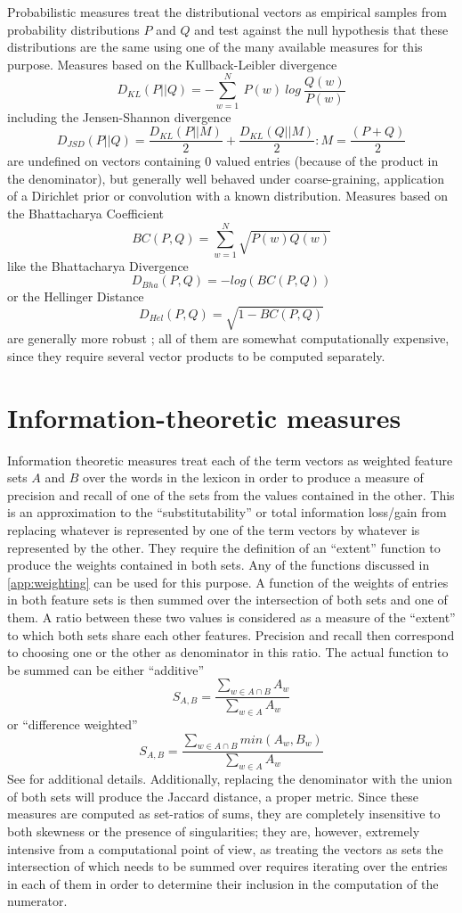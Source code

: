 Probabilistic measures treat the distributional vectors as empirical samples from probability distributions $P$ and $Q$ and test against the null hypothesis that these distributions are the same using one of the many available measures for this purpose.
Measures based on the Kullback-Leibler divergence
    $$D_{KL}(P||Q) = - \sum_{w=1}^N\:P(w)\:log\:\frac{Q(w)}{P(w)}$$
including the Jensen-Shannon divergence
    $$D_{JSD}(P||Q) = \frac{D_{KL}(P||M)}{2} + \frac{D_{KL}(Q||M)}{2} : M = \frac{( P + Q )}{2}$$
are undefined on vectors containing $0$ valued entries (because of the product in the denominator), but generally well behaved under coarse-graining, application of a Dirichlet prior or convolution with a known distribution.
Measures based on the Bhattacharya Coefficient
    $$BC(P,Q) = \sum_{w=1}^N \sqrt{ P(w) Q(w) }$$
like the Bhattacharya Divergence
    $$D_{Bha}(P,Q) = - log( BC(P,Q) )$$
or the Hellinger Distance
    $$D_{Hel}(P,Q) = \sqrt{ 1 - BC(P,Q) }$$
are generally more robust \citep{dedeo2013}; all of them are somewhat computationally expensive, since they require several vector products to be computed separately.

\section{Information-theoretic measures}

Information theoretic measures treat each of the term vectors as weighted feature sets $A$ and $B$ over the words in the lexicon in order to produce a measure of precision and recall of one of the sets from the values contained in the other.
This is an approximation to the ``substitutability'' or total information loss/gain from replacing whatever is represented by one of the term vectors by whatever is represented by the other.
They require the definition of an ``extent'' function to produce the weights contained in both sets.
Any of the functions discussed in \ref{app:weighting} can be used for this purpose.
A function of the weights of entries in both feature sets is then summed over the intersection of both sets and one of them.
A ratio between these two values is considered as a measure of the ``extent'' to which both sets share each other features.
Precision and recall then correspond to choosing one or the other as denominator in this ratio.
The actual function to be summed can be either ``additive''
    $$S_{A,B} = \frac{\sum_{ w \in A \cap B } A_w}{\sum_{ w \in A } A_w}$$
or ``difference weighted''
    $$S_{A,B} = \frac{\sum_{ w \in A \cap B } min( A_w, B_w )}{\sum_{ w \in A } A_w}$$
See \citet{weeds2005,rule2015} for additional details.
Additionally, replacing the denominator with the union of both sets will produce the Jaccard distance, a proper metric.
Since these measures are computed as set-ratios of sums, they are completely insensitive to both skewness or the presence of singularities; they are, however, extremely intensive from a computational point of view, as treating the vectors as sets the intersection of which needs to be summed over requires iterating over the entries in each of them in order to determine their inclusion in the computation of the numerator.
